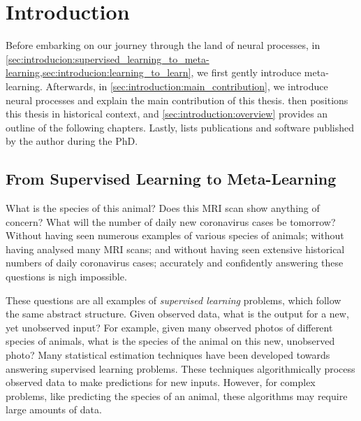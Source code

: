 \documentclass[12pt, twoside]{report}
\begin{document}
\chapter{Introduction}
\label{sec:introduction:introduction}

Before embarking on our journey through the land of neural processes,
in \cref{sec:introducion:supervised_learning_to_meta-learning,sec:introducion:learning_to_learn},
we first gently introduce meta-learning.
Afterwards, in \cref{sec:introduction:main_contribution},
we introduce neural processes and explain the main contribution of this thesis.
 then positions this thesis in historical context,
and \cref{sec:introduction:overview} provides an outline of the following chapters.
Lastly,  lists publications and software published by the author during the PhD.

\section{From Supervised Learning to Meta-Learning}
\label{sec:introducion:supervised_learning_to_meta-learning}

What is the species of this animal?
Does this MRI scan show anything of concern?
What will the number of daily new coronavirus cases be tomorrow?
Without having seen numerous examples of various species of animals;
without having analysed many MRI scans; and
without having seen extensive historical numbers of daily coronavirus cases;
accurately and confidently answering these questions is nigh impossible.

These questions are all examples of \emph{supervised learning} problems,
which follow the same abstract structure.
Given observed data, what is the output for a new, yet unobserved input?
For example, given many observed photos of different species of animals, what is the species of the animal on this new, unobserved photo?
Many statistical estimation techniques have been developed towards answering supervised learning problems.
These techniques algorithmically process observed data to make predictions for new inputs.
However, for complex problems, like predicting the species of an animal, these algorithms may require large amounts of data.
\end{document}
